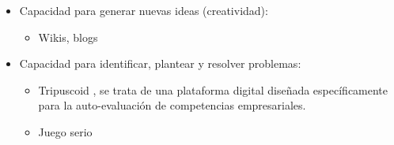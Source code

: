 \begin{itemize}
\begin{itemize}
	\end{itemize}
\item Capacidad para generar nuevas ideas (creatividad):
	\begin{itemize} 
	\item Wikis, blogs \cite{Piedra:2010}
	\end{itemize}
\item Capacidad para identificar, plantear y resolver problemas:
	\begin{itemize} 
	\item Tripuscoid \cite{Achcaoucaou:2012}, se trata de una plataforma digital diseñada específicamente para la auto-evaluación de competencias empresariales.
	\item Juego serio \cite{Guenaga:2013}
	\end{itemize}
\end{itemize}

